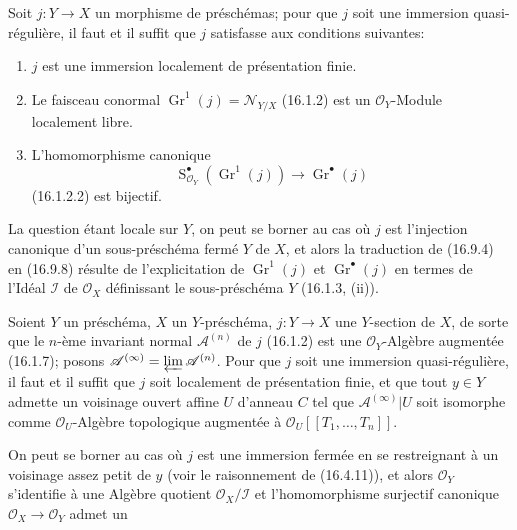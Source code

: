 \begin{proposition}[16.9.8]
\label{IV.16.9.8}
Soit $j:Y\to X$ un morphisme de préschémas; pour que $j$ soit une immersion
quasi-régulière, il faut et il suffit que $j$ satisfasse aux conditions
suivantes:
\begin{enumerate}
  \item[(i)] $j$ est une immersion localement de présentation finie.
  \item[(ii)] Le faisceau conormal
  $\operatorname{Gr}^1(j)=\mathcal{N}_{Y/X}$ (16.1.2) est un
  $\mathcal{O}_Y$-Module localement libre.
  \item[(iii)] L'homomorphisme canonique
  \[
    \operatorname{S}_{\mathcal{O}_Y}^{\bullet}
      (\operatorname{Gr}^1(j))\longrightarrow\operatorname{Gr}^{\bullet}(j)
  \]
  (16.1.2.2) est bijectif.
\end{enumerate}
\end{proposition}

La question étant locale sur $Y$, on peut se borner au cas où $j$ est
l'injection canonique d'un sous-préschéma fermé $Y$ de $X$, et alors la
traduction de (16.9.4) en (16.9.8) résulte de l'explicitation de
$\operatorname{Gr}^1(j)$ et $\operatorname{Gr}^{\bullet}(j)$ en termes de
l'Idéal $\mathscr{I}$ de $\mathcal{O}_X$ définissant le sous-préschéma $Y$
(16.1.3, (ii)).

\begin{corollary}[16.9.9]
\label{IV.16.9.9}
Soient $Y$ un préschéma, $X$ un $Y$-préschéma, $j:Y\to X$ une $Y$-section
de $X$, de sorte que le $n$-ème invariant normal $\mathscr{A}^{(n)}$ de $j$
(16.1.2) est une $\mathcal{O}_Y$-Algèbre augmentée (16.1.7); posons
$\mathscr{A}^{(\infty)}=\varprojlim\mathscr{A}^{(n)}$. Pour que $j$ soit une
immersion quasi-régulière, il faut et il suffit que $j$ soit localement de
présentation finie, et que tout $y\in Y$ admette un voisinage ouvert affine
$U$ d'anneau $C$ tel que $\mathscr{A}^{(\infty)}|U$ soit isomorphe comme
$\mathcal{O}_U$-Algèbre topologique augmentée à
$\mathcal{O}_U[[T_1,\ldots,T_n]]$.
\end{corollary}

On peut se borner au cas où $j$ est une immersion fermée en se restreignant
à un voisinage assez petit de $y$ (voir le raisonnement de (16.4.11)), et
alors $\mathcal{O}_Y$ s'identifie à une Algèbre quotient
$\mathcal{O}_X/\mathscr{I}$ et l'homomorphisme surjectif canonique
$\mathcal{O}_X\to\mathcal{O}_Y$ admet un
